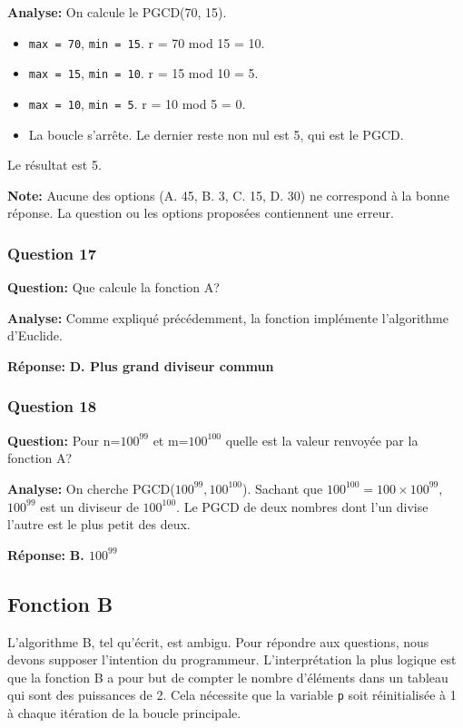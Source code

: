 \documentclass[12pt,a4paper]{article}
\begin{document}
\textbf{Analyse:} On calcule le PGCD(70, 15).
\begin{itemize}
    \item \texttt{max = 70}, \texttt{min = 15}. r = 70 mod 15 = 10.
    \item \texttt{max = 15}, \texttt{min = 10}. r = 15 mod 10 = 5.
    \item \texttt{max = 10}, \texttt{min = 5}. r = 10 mod 5 = 0.
    \item La boucle s'arrête. Le dernier reste non nul est 5, qui est le PGCD.
\end{itemize}
Le résultat est 5.

\textbf{Note:} Aucune des options (A. 45, B. 3, C. 15, D. 30) ne correspond à la bonne réponse. La question ou les options proposées contiennent une erreur.

\subsubsection{Question 17}
\textbf{Question:} Que calcule la fonction A?

\textbf{Analyse:} Comme expliqué précédemment, la fonction implémente l'algorithme d'Euclide.

\textbf{Réponse:} \textbf{D. Plus grand diviseur commun}

\subsubsection{Question 18}
\textbf{Question:} Pour n=$100^{99}$ et m=$100^{100}$ quelle est la valeur renvoyée par la fonction A?

\textbf{Analyse:} On cherche PGCD($100^{99}, 100^{100}$). Sachant que $100^{100} = 100 \times 100^{99}$, $100^{99}$ est un diviseur de $100^{100}$. Le PGCD de deux nombres dont l'un divise l'autre est le plus petit des deux.

\textbf{Réponse:} \textbf{B. $100^{99}$}

\subsection{Fonction B}
L'algorithme B, tel qu'écrit, est ambigu. Pour répondre aux questions, nous devons supposer l'intention du programmeur. L'interprétation la plus logique est que la fonction B a pour but de compter le nombre d'éléments dans un tableau qui sont des puissances de 2. Cela nécessite que la variable \texttt{p} soit réinitialisée à 1 à chaque itération de la boucle principale.
\end{document}
